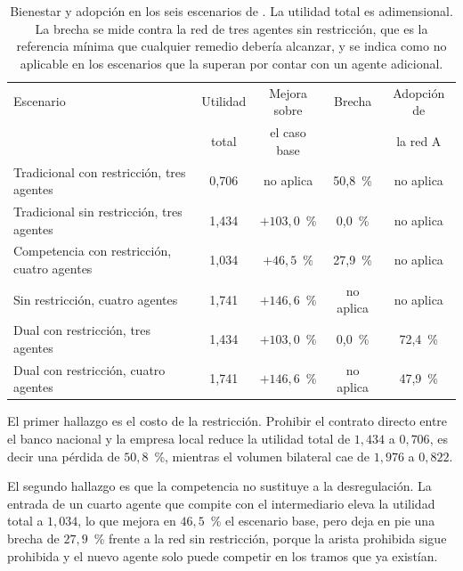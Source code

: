 \begin{table}[H]
    \centering
    \small
    \caption[Escenarios de la tesis de referencia inmediata]{Bienestar y
    adopción en los seis escenarios de . La
    utilidad total es adimensional. La brecha se mide contra la red de tres
    agentes sin restricción, que es la referencia mínima que cualquier remedio
    debería alcanzar, y se indica como no aplicable en los escenarios que la
    superan por contar con un agente adicional.}
    \label{tab:venegas-escenarios}
    \begin{tabular}{p{5.2cm}cccc}
        \toprule
        Escenario & Utilidad & Mejora sobre & Brecha & Adopción de \\
         & total & el caso base & & la red A \\
        \midrule
        Tradicional con restricción, tres agentes & 0,706 & no aplica & 50,8~\% & no aplica \\
        Tradicional sin restricción, tres agentes & 1,434 & $+103,0$~\% & 0,0~\% & no aplica \\
        Competencia con restricción, cuatro agentes & 1,034 & $+46,5$~\% & 27,9~\% & no aplica \\
        Sin restricción, cuatro agentes & 1,741 & $+146,6$~\% & no aplica & no aplica \\
        Dual con restricción, tres agentes & 1,434 & $+103,0$~\% & 0,0~\% & 72,4~\% \\
        Dual con restricción, cuatro agentes & 1,741 & $+146,6$~\% & no aplica & 47,9~\% \\
        \bottomrule
    \end{tabular}
\end{table}

El primer hallazgo es el costo de la restricción. Prohibir el contrato directo entre el banco nacional y la empresa local reduce la utilidad total de $1,434$ a $0,706$, es decir una pérdida de $50,8$~\%, mientras el volumen bilateral cae de $1,976$ a $0,822$.

El segundo hallazgo es que la competencia no sustituye a la desregulación. La entrada de un cuarto agente que compite con el intermediario eleva la utilidad total a $1,034$, lo que mejora en $46,5$~\% el escenario base, pero deja en pie una brecha de $27,9$~\% frente a la red sin restricción, porque la arista prohibida sigue prohibida y el nuevo agente solo puede competir en los tramos que ya existían.

